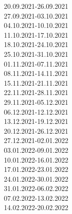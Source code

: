 
\begin{description}
    \item[20.09.2021-26.09.2021]
    \item[27.09.2021-03.10.2021]
    \item[04.10.2021-10.10.2021]
    \item[11.10.2021-17.10.2021]
    \item[18.10.2021-24.10.2021]
    \item[25.10.2021-31.10.2021]
    \item[01.11.2021-07.11.2021]
    \item[08.11.2021-14.11.2021]
    \item[15.11.2021-21.11.2021]
    \item[22.11.2021-28.11.2021]
    \item[29.11.2021-05.12.2021]
    \item[06.12.2021-12.12.2021]
    \item[13.12.2021-19.12.2021]
    \item[20.12.2021-26.12.2021]
    \item[27.12.2021-02.01.2022]
    \item[03.01.2022-09.01.2022]
    \item[10.01.2022-16.01.2022]
    \item[17.01.2022-23.01.2022]
    \item[24.01.2022-30.01.2022]
    \item[31.01.2022-06.02.2022]
    \item[07.02.2022-13.02.2022]
    \item[14.02.2022-20.02.2022]
\end{description}